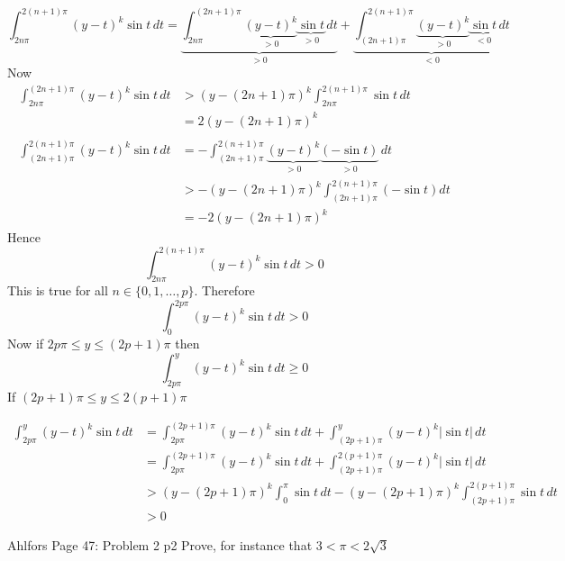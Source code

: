 \documentclass[a4paper, 11pt]{article}
\begin{document}
{	$$
		\int_{2n\pi}^{2(n+1)\pi} (y-t)^k\sin t\,dt = \underbrace{\int_{2n\pi}^{(2n+1)\pi} \underbrace{(y-t)^k}_{>0}\underbrace{\sin t}_{>0}\,dt}_{>0}+\underbrace{\int^{2(n+1)\pi}_{(2n+1)\pi} \underbrace{(y-t)^k}_{>0}\underbrace{\sin t}_{<0}\,dt}_{<0}$$Now \begin{align*}
			\int_{2n\pi}^{(2n+1)\pi} {(y-t)^k}{\sin t}\,dt & > (y-(2n+1)\pi)^k\int^{2(n+1)\pi}_{2n\pi}\sin t\, dt\\
			&= 2 (y-(2n+1)\pi)^k\\ 
			\\
			\int^{2(n+1)\pi}_{(2n+1)\pi} {(y-t)^k}{\sin t}\,dt & =-\int^{2(n+1)\pi}_{(2n+1)\pi} \underbrace{(y-t)^k}_{>0}\underbrace{(-\sin t)}_{>0}\,dt\\ &>-(y-(2n+1)\pi)^k\int^{2(n+1)\pi}_{(2n+1)\pi}(-\sin t)dt\\
			& = -2(y-(2n+1)\pi)^k
	\end{align*}Hence $$	\int_{2n\pi}^{2(n+1)\pi} (y-t)^k\sin t\,dt>0$$This is true for all $n\in \{0,1,\dots,p\}$. Therefore $$\int_0^{2p\pi} (y-t)^k \sin t\, dt > 0$$Now if $2p\pi\leq y\leq (2p+1)\pi$ then $$\int_{2p\pi}^y (y-t)^k\sin t\,dt\geq 0$$If $(2p+1)\pi\leq y\leq 2(p+1)\pi$
	
	\begin{align*}
		\int_{2p\pi}^y (y-t)^k\sin t\,dt &= \int_{2p\pi}^{(2p+1)\pi}(y-t)^k\sin t\,dt + \int_{(2p+1)\pi}^y(y-t)^k\lvert\sin t\rvert\,dt\\
		&= \int_{2p\pi}^{(2p+1)\pi}(y-t)^k\sin t\,dt + \int_{(2p+1)\pi}^{2(p+1)\pi}(y-t)^k\lvert\sin t\rvert\,dt\\
		&> (y-(2p+1)\pi)^k \int_0^\pi\sin t\,dt - (y-(2p+1)\pi)^k\int_{(2p+1)\pi}^{2(p+1)\pi}\sin t\,dt\\
		&> 0
	\end{align*}
		
	}
	
	
	
	\begin{problem}{%
			Ahlfors Page 47: Problem 2
		}{p2%
		}
		Prove, for instance that $3<\pi< 2\sqrt{3}$
	\end{problem}
	
\end{document}
